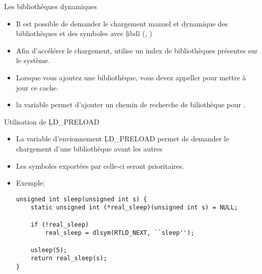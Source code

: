 \begin{frame}[fragile=singleslide]{Les bibliothèques dynamiques}
  \begin{itemize}
  \item Il est possible de  demander le chargement manuel et dynamique
    des    bibliothèques    et    des    symboles    avec    \c{libdl}
    (, )
  \item Afin d'accélérer le  chargement,  utilise un index de
    bibliothèques présentes  sur le  système.
  \item  Lorsque vous  ajoutez une  bibliothèque, vous  devez appeller
     pour mettre à jour ce cache.
  \item la variable   permet d'ajouter un chemin de
    recherche de biliothèque pour .
  \end{itemize}
\end{frame}

\begin{frame}[fragile=singleslide]{Utilisation de \c{LD_PRELOAD}}
  \begin{itemize}
  \item La  variable d'envionnement \c{LD_PRELOAD}  permet de demander
    le chargement d'une bibliothèque avant les autres
  \item Les symboles exportées par celle-ci seront prioritaires.
  \item Exemple:
    \begin{lstlisting}
unsigned int sleep(unsigned int s) {
    static unsigned int (*real_sleep)(unsigned int s) = NULL;

    if (!real_sleep)
        real_sleep = dlsym(RTLD_NEXT, ``sleep'');

    usleep(5);
    return real_sleep(s);
}
    \end{lstlisting}
  \end{itemize}
\end{frame}


